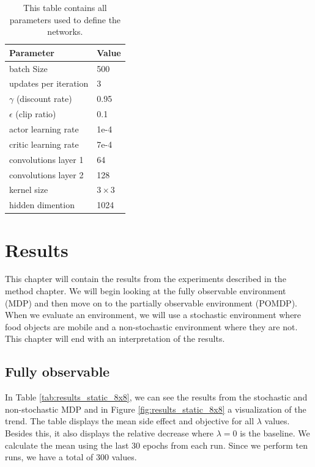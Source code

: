 \documentclass[12pt,A4]{report}
\theoremstyle{definition}
\begin{document}
\begin{table}[H]
  \centering
  \caption{This table contains all parameters used to define the networks.}
  \begin{tabular}{l|l}
    Parameter & Value \\ \hline
    batch Size & 500 \\
    updates per iteration & 3 \\
    $\gamma$ (discount rate) & 0.95 \\
    $\epsilon$ (clip ratio) & 0.1 \\
    actor learning rate & 1e-4 \\
    critic learning rate & 7e-4 \\
    convolutions layer 1 & 64 \\
    convolutions layer 2 & 128 \\
    kernel size & $3 \times 3$\\
    hidden dimention & 1024 \\
  \end{tabular}
  \label{tab:train_parms}
\end{table}


\chapter{Results}
This chapter will contain the results from the experiments described in the method chapter. We will begin looking at the fully observable environment (MDP) and then move on to the partially observable environment (POMDP). When we evaluate an environment, we will use a stochastic environment where food objects are mobile and a non-stochastic environment where they are not. This chapter will end with an interpretation of the results.

\section{Fully observable}
In Table \ref{tab:results_static_8x8}, we can see the results from the stochastic and non-stochastic MDP and in Figure \ref{fig:results_static_8x8} a visualization of the trend. The table displays the mean side effect and objective for all $\lambda$ values. Besides this, it also displays the relative decrease where $\lambda=0$ is the baseline. We calculate the mean using the last 30 epochs from each run. Since we perform ten runs, we have a total of 300 values. 
\end{document}
